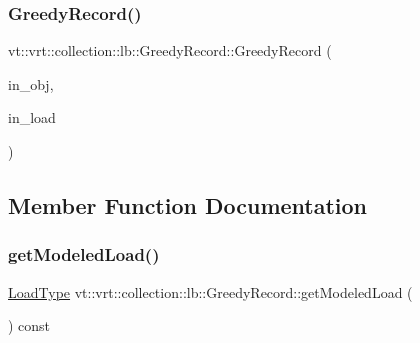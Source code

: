 \subsubsection{\texorpdfstring{Greedy\+Record()}{GreedyRecord()}}
{\footnotesize\ttfamily vt\+::vrt\+::collection\+::lb\+::\+Greedy\+Record\+::\+Greedy\+Record (\begin{DoxyParamCaption}\item[{\hyperlink{structvt_1_1vrt_1_1collection_1_1lb_1_1_greedy_record_a6b0754b2434fca9e865fa8422e3d709e}{Obj\+Type} const \&}]{in\+\_\+obj,  }\item[{\hyperlink{namespacevt_a8fb51741340b87d7aaee0bef60e9896b}{Load\+Type} const \&}]{in\+\_\+load }\end{DoxyParamCaption})\hspace{0.3cm}{\ttfamily [inline]}}



\subsection{Member Function Documentation}
\mbox{\label{structvt_1_1vrt_1_1collection_1_1lb_1_1_greedy_record_af9b5d5ee1c115d6bfeb67255267efb57}} 
\subsubsection{\texorpdfstring{get\+Modeled\+Load()}{getModeledLoad()}}
{\footnotesize\ttfamily \hyperlink{namespacevt_a8fb51741340b87d7aaee0bef60e9896b}{Load\+Type} vt\+::vrt\+::collection\+::lb\+::\+Greedy\+Record\+::get\+Modeled\+Load (\begin{DoxyParamCaption}{ }\end{DoxyParamCaption}) const\hspace{0.3cm}{\ttfamily [inline]}}

\mbox{\label{structvt_1_1vrt_1_1collection_1_1lb_1_1_greedy_record_a5f7a3e144c43f74c587ff054af1e267f}} 
